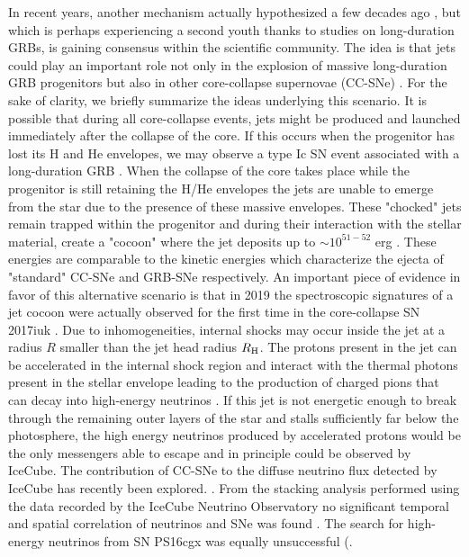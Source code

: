 \documentclass[twocolumn]{aastex631}
\begin{document}
In recent years, another mechanism actually hypothesized a few decades ago \citep{Bisnovatyi1970,LeBlanc1970,Ostriker1971}, but which is perhaps experiencing a second youth thanks to studies on long-duration GRBs, is gaining consensus within the scientific community. The idea is that jets could play an important role not only in the explosion of massive long-duration GRB progenitors but also in other core-collapse supernovae (CC-SNe) \citep{Piran2019,Soker22}. For the sake of clarity, we briefly summarize the ideas underlying this scenario.  It is possible that during all core-collapse events, jets might be produced and launched immediately after the collapse of the core. If this occurs when the progenitor has lost its H and He envelopes, we may observe a type Ic SN event associated with a long-duration GRB \citep{Meszaros2001Jet,Woosley2006,Hjorth011}. When the collapse of the core takes place while the progenitor is still retaining the H/He envelopes the jets are unable to emerge from the star due to the presence of these massive envelopes. These "chocked" jets remain trapped within the progenitor and  during their interaction with the stellar material, create a "cocoon" where the jet deposits up to $\sim 10^{51-52}$ erg \citep{Nakar2017}. These energies are comparable to the kinetic energies which characterize the ejecta of "standard" CC-SNe and GRB-SNe respectively. An important piece of evidence in favor of this alternative scenario is that in 2019 the spectroscopic signatures of a jet cocoon were actually observed for the first time in the core-collapse SN 2017iuk \citep{Izzo2019}. 
Due to inhomogeneities, internal shocks may occur inside the jet at a radius $R$ smaller than the jet head radius $ R_{\rm H}$. The protons present in the jet can be accelerated in the internal  shock region and interact with the thermal photons present in the stellar envelope leading to the production of charged pions that can decay into high-energy neutrinos \citep{Meszaros2001Jet}. If this jet is not energetic enough to break through the remaining outer layers of the star and stalls sufficiently far below the photosphere, the high energy neutrinos produced by accelerated protons would be the only messengers able to escape \citep{Senno2016,Murase2016,He2018,Guetta2020,Fasano2021} and in principle could be observed by IceCube. 
The contribution of CC-SNe to the diffuse neutrino flux detected by IceCube has recently been explored. \cite{icecube_2023}. From the stacking analysis performed using the data recorded by the IceCube Neutrino Observatory no significant temporal and spatial correlation of neutrinos and SNe was found \cite{icecube_2023}. The search for high-energy neutrinos from SN PS16cgx was equally unsuccessful (\cite{kankare2019}.
\end{document}
